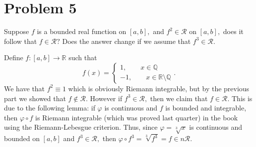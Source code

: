 \documentclass[11pt]{article}
\newcommand{\bbQ}{\mathbb{Q}}
\newcommand{\bbR}{\mathbb{R}}
\begin{document}
\newpage
\section*{Problem 5}
\begin{problem}
    Suppose $f$ is a bounded real function on $[a,b],$ and $f^2 \in \mathcal{R}$ on $[a,b],$ does it follow that $f \in \mathcal{R}?$ Does the answer change if we assume that $f^3 \in \mathcal{R}.$
\end{problem}
\begin{solution}
    Define $f:[a,b]\to \bbR$ such that 
    \[f(x) = 
    \begin{cases}
        1, \qquad x \in \bbQ\\
        -1, \qquad x \in \bbR \setminus \bbQ
    \end{cases}.\]
    We have that $f^2 \equiv 1$ which is obviously Riemann integrable, but by the previous part we showed that $f \notin \mathcal{R}.$ However if $f^3 \in \mathcal{R},$ then we claim that $f\in \mathcal{R}.$ This is due to the following lemma: if $\varphi$ is continuous and $f$ is bounded and integrable, then $\varphi \circ f$ is Riemann integrable (which was proved last quarter) in the book using the Riemann-Lebesgue criterion. Thus, since $\varphi = \sqrt[3]{x}$ is continuous and bounded on $[a,b]$ and $f^3\in \mathcal{R},$ then $\varphi \circ f^3 = \sqrt[3]{f^3} = f\in n\mathcal{R}.$   
\end{solution}
\newpage
\end{document}
